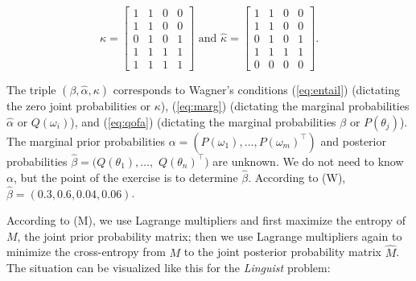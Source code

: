 \documentclass[11pt]{article}
\begin{document}
\begin{equation}
  \label{eq:p3}
  \kappa=\left[
  \begin{array}{cccc}
    1 & 1 & 0 & 0 \\
    1 & 1 & 0 & 0 \\
    0 & 1 & 0 & 1 \\
    1 & 1 & 1 & 1 \\
    1 & 1 & 1 & 1
  \end{array}
\right]\mbox{ and }
  \hat{\kappa}=\left[
  \begin{array}{cccc}
    1 & 1 & 0 & 0 \\
    1 & 1 & 0 & 0 \\
    0 & 1 & 0 & 1 \\
    1 & 1 & 1 & 1 \\
    0 & 0 & 0 & 0
  \end{array}
\right].
\end{equation}

The triple $(\beta,\hat{\alpha},\kappa)$ corresponds to Wagner's
conditions (\ref{eq:entail}) (dictating the zero joint probabilities
or $\kappa$), (\ref{eq:marg}) (dictating the marginal probabilities
$\hat{\alpha}$ or $Q(\omega_{i})$), and (\ref{eq:qofa}) (dictating the
marginal probabilities $\beta$ or $P(\theta_{j})$). The marginal prior
probabilities
$\alpha=(P(\omega_{1}),\ldots,P(\omega_{m})^{\intercal})$ and
posterior probabilities $\hat{\beta}=(Q(\theta_{1}),\ldots,$
$Q(\theta_{n})^{\intercal})$ are unknown. We do not need to know
$\alpha$, but the point of the exercise is to determine $\hat{\beta}$.
According to (W), $\hat{\beta}=(0.3,0.6,0.04,0.06)$.

According to (M), we use Lagrange multipliers and first maximize the
entropy of $M$, the joint prior probability matrix; then we use
Lagrange multipliers again to minimize the cross-entropy from $M$ to
the joint posterior probability matrix $\hat{M}$. The situation can be
visualized like this for the \emph{Linguist} problem:
\end{document}
